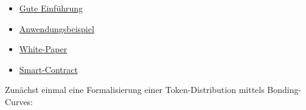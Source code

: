 
\vspace{0.2cm}

\begin{itemize}
  \item \href{https://medium.com/@simondlr/tokens-2-0-curved-token-bonding-in-curation-markets-1764a2e0bee5}{Gute Einführung}
  \item \href{https://www.newsbtc.com/sponsored/zap-fun-profit/}{Anwendungsbeispiel}
  \item \href{https://docs.google.com/document/d/1VNkBjjGhcZUV9CyC0ccWYbqeOoVKT2maqX0rK3yXB20/edit}{White-Paper}
  \item \href{https://github.com/ConsenSysMesh/curationmarkets/blob/master/CurationMarkets.sol}{Smart-Contract}
\end{itemize}  



\vspace{0.5cm}

Zunächst einmal eine Formalisierung einer Token-Distribution mittels Bonding-Curves:

\vspace{0.2cm}

